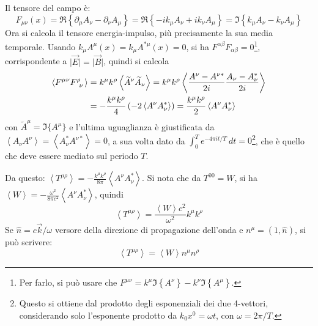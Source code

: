 \documentclass[10pt, a4paper]{scrartcl}
\numberwithin{equation}{subsection}
\theoremstyle{style1}
\begin{document}
Il tensore del campo \`e:
\[
F_{\mu \nu } (x) = \Re \left\{ \partial _\mu  A_\nu  - \partial _\nu  A_\mu  \right\}  = \Re \left\{ - i k_\mu  A_\nu  + i k_\nu  A_\mu  \right\} = \Im \left\{ k_\mu A_\nu -k_\nu A_\mu  \right\} 
\] 
Ora si calcola il tensore energia-impulso, pi\`u precisamente la sua media temporale. Usando $k_\mu A^\mu (x) = k_\mu A^{*\mu}(x)=0 $, si ha $F^{\alpha  \beta } F_{\alpha \beta } =0$\footnote{Per farlo, si pu\`o usare che $F^{\mu \nu } = k^\mu \Im\left\{ A^\nu  \right\} - k^\nu \Im\left\{ A^\mu  \right\} $.}, corrispondente a $\lvert \vec{E} \rvert = \lvert \vec{B} \rvert $, quindi si calcola
\begin{equation}
	\begin{split}
		\left\langle F^{\mu \nu } F\indices{^{\rho }_{\nu }}   \right\rangle &= k^\mu k^\rho \left\langle \widetilde{A}^\nu \widetilde{A}_\nu  \right\rangle = k^\mu k^\rho \left\langle \frac{A^\nu - A^{\nu *} }{2i} \frac{A_\nu - A^*_{\nu} }{2i}\right\rangle \\
										     &= -\frac{k^\mu k^\rho }{4} \left(-2 \left\langle A^\nu A_\nu ^* \right\rangle\right) = \frac{k^\mu k^\rho }{2}\left\langle A^\nu A_\nu ^* \right\rangle
	\end{split}
\end{equation}
con $\widetilde{A }^\mu  = \Im\{A^\mu \}$ e l'ultima uguaglianza \`e giustificata da $\left\langle A_\nu A^\nu  \right\rangle = \left\langle A^*_\nu A^{\nu *}  \right\rangle=0$, a sua volta dato da $\int_{0} ^T e^{-4 \pi i t / T} \ dt = 0$\footnote{Questo si ottiene dal prodotto degli esponenziali dei due 4-vettori, considerando solo l'esponente prodotto da $k_0x^0 = \omega t$, con $\omega = 2\pi/T$.}, che \`e quello che deve essere mediato sul periodo $T$.

Da questo: $\left\langle T^{\mu \rho }  \right\rangle = - \frac{k^\mu  k^\rho }{8 \pi} \left\langle A^\nu A^* _\nu  \right\rangle$. Si nota che da $T^{00} = W$, si ha $\left\langle W \right\rangle=-\frac{\omega^2}{8\pi c^2}\left\langle A^\nu A^*_\nu  \right\rangle$, quindi
\begin{equation}
	\left\langle T^{\mu \rho }  \right\rangle = \frac{\left\langle W \right\rangle c^2}{\omega^2}k^\mu  k^\rho 
\end{equation}
Se $\hat{n}= c \vec{k} / \omega$ versore della direzione di propagazione dell'onda e $n^\mu =(1,\hat{n})$, si pu\`o scrivere:
\begin{equation}
	\left\langle T^{\mu \rho }  \right\rangle = \left\langle W \right\rangle n^\mu  n^\rho 
\end{equation}
\end{document}
